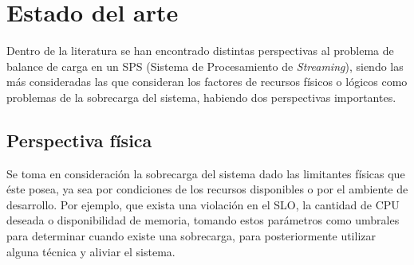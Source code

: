 \chapter{Estado del arte}
\label{cap:estado_del_arte}



Dentro de la literatura se han encontrado distintas perspectivas al problema de balance de carga en un SPS (Sistema de Procesamiento de \textsl{Streaming}), siendo las más consideradas las que consideran los factores de recursos físicos o lógicos como problemas de la sobrecarga del sistema, habiendo dos perspectivas importantes.

\section{Perspectiva física}
Se toma en consideración la sobrecarga del sistema dado las limitantes físicas que éste posea, ya sea por condiciones de los recursos disponibles o por el ambiente de desarrollo. Por ejemplo, que exista una violación en el SLO, la cantidad de CPU deseada o disponibilidad de memoria, tomando estos parámetros como umbrales para determinar cuando existe una sobrecarga, para posteriormente utilizar alguna técnica y aliviar el sistema.

